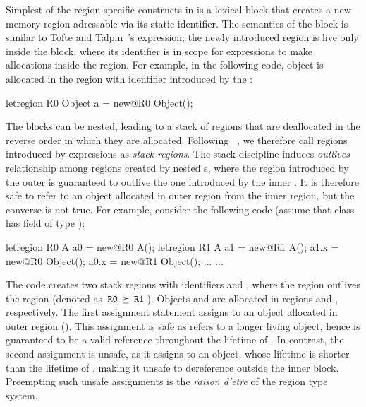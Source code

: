 Simplest of the region-specific constructs in \name is a 
lexical block that creates a new memory region adressable via its
static identifier. The semantics of the  block is similar
to Tofte and Talpin~\cite{ttpopl94}'s  expression; the
newly introduced region is live only inside the block, where its
identifier is in scope for  expressions to make allocations
inside the region. For example, in the following code, object  is
allocated in the region with identifier  introduced by the
:
\begin{center}
\begin{codejava}
  letregion R0 {
    Object a = new@R0 Object();
  }
\end{codejava}
\end{center}
The  blocks can be nested, leading to a stack of regions
that are deallocated in the reverse order in which they are allocated.
Following ~\cite{cyclonepldi02}, we therefore call regions introduced
by  expressions as \emph{stack regions}. The stack
discipline induces \emph{outlives} relationship among regions created
by nested s, where the region introduced by the outer
 is guaranteed to outlive the one introduced by the inner
. It is therefore safe to refer to an object allocated in
outer region from the inner region, but the converse is not true. For
example, consider the following code (assume that class  has
field  of type ):
\begin{center}
\begin{codejava}
  letregion R0 {
    A a0 = new@R0 A();
    letregion R1 {
      A a1 = new@R1 A();
      a1.x = new@R0 Object();
      a0.x = new@R1 Object();
      ...
    }
    ...
  }
\end{codejava}
\end{center}
The code creates two stack regions with identifiers  and ,
where the region  outlives the region  (denoted as $\,{\tt R0}\,
\succeq \,{\tt R1}\,$).  Objects  and  are allocated in regions
 and , respectively. The first assignment statement
assigns to  an object allocated in outer region (). This
assignment is safe as  refers to a longer living object, hence
is guaranteed to be a valid reference throughout the lifetime of
.  In contrast, the second assignment is unsafe, as it assigns
to  an object, whose lifetime is shorter than the lifetime of
, making it unsafe to dereference  outside the inner
block. 
Preempting such unsafe assignments is the \emph{raison d'etre} of the
region type system.

